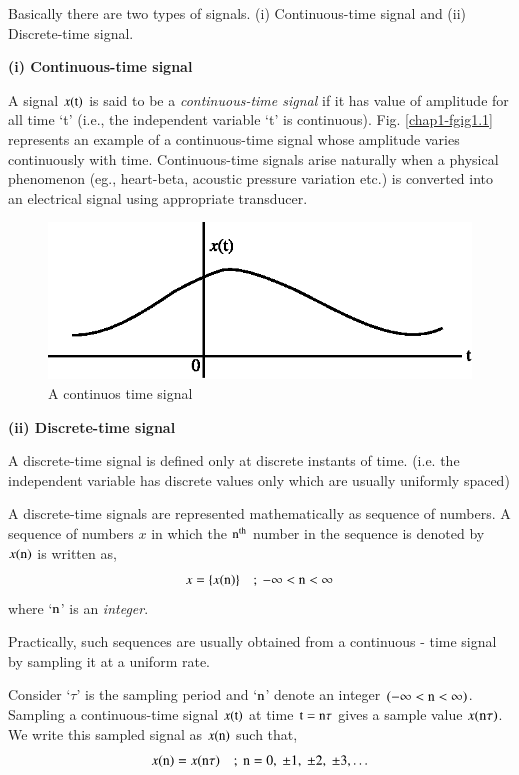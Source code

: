 Basically there are two types of signals. (i) Continuous-time signal and (ii) Discrete-time signal.

\medskip
\noindent
{\bf (i) Continuous-time signal}
\smallskip

A signal $x(\textrm{t})$ is said to be a {\em continuous-time signal} if it has value of amplitude for all time `t' (i.e., the independent variable `t' is continuous). Fig. \ref{chap1-fgig1.1} represents an example of a continuous-time signal whose amplitude varies continuously with time. Continuous-time signals arise naturally when a physical phenomenon (eg., heart-beta, acoustic pressure variation etc.) is converted into an electrical signal using appropriate transducer.
\begin{figure}[H]
\centering
\includegraphics{src/chap1/fig1.eps}
\caption{A continuos time signal}\label{chap1-fig1.1}
\end{figure}

\medskip
\noindent
{\bf (ii) Discrete-time signal}
\smallskip

A discrete-time signal is defined only at discrete instants of time. (i.e. the independent variable has discrete values only which are usually uniformly spaced)

A discrete-time signals are represented mathematically as sequence of numbers. A sequence of numbers $x$ in which the $\textrm{n}^{\text{th}}$ number in the sequence is denoted by $x(\textrm{n})$ is written as,
$$
x=\{x(\textrm{n})\}\quad ;~ -\infty<\textrm{n}<\infty
$$
where `$\textrm{n}$' is an {\em integer}.

Practically, such sequences are usually obtained from a continuous - time signal by sampling it at a uniform rate.

Consider `$\tau$' is the sampling period and `$\textrm{n}$' denote an integer $(-\infty<\textrm{n}<\infty)$. Sampling a continuous-time signal $x(\textrm{t})$ at time $\textrm{t}=\textrm{n}\tau$ gives a sample value $x(\textrm{n}\tau)$. We write this sampled signal as $x(\textrm{n})$ such that,
$$
x(\textrm{n})=x(\textrm{n}\tau)\quad ;~ \textrm{n}=0, \ \pm 1, \ \pm 2, \ \pm 3,\ldots
$$

